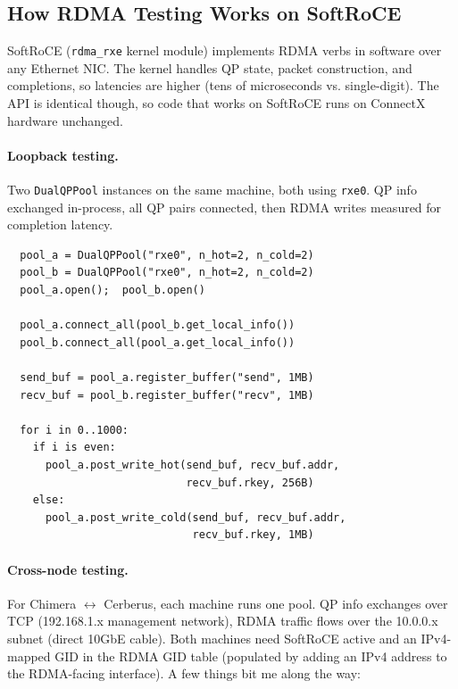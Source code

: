 \documentclass[11pt]{article}
\begin{document}
\subsection{How RDMA Testing Works on SoftRoCE}

SoftRoCE (\texttt{rdma\_rxe} kernel module) implements RDMA verbs in software over any Ethernet NIC. The kernel handles QP state, packet construction, and completions, so latencies are higher (tens of microseconds vs. single-digit). The API is identical though, so code that works on SoftRoCE runs on ConnectX hardware unchanged.

\paragraph{Loopback testing.} Two \texttt{DualQPPool} instances on the same machine, both using \texttt{rxe0}. QP info exchanged in-process, all QP pairs connected, then RDMA writes measured for completion latency.

\begin{verbatim}
  pool_a = DualQPPool("rxe0", n_hot=2, n_cold=2)
  pool_b = DualQPPool("rxe0", n_hot=2, n_cold=2)
  pool_a.open();  pool_b.open()

  pool_a.connect_all(pool_b.get_local_info())
  pool_b.connect_all(pool_a.get_local_info())

  send_buf = pool_a.register_buffer("send", 1MB)
  recv_buf = pool_b.register_buffer("recv", 1MB)

  for i in 0..1000:
    if i is even:
      pool_a.post_write_hot(send_buf, recv_buf.addr,
                            recv_buf.rkey, 256B)
    else:
      pool_a.post_write_cold(send_buf, recv_buf.addr,
                             recv_buf.rkey, 1MB)
\end{verbatim}

\paragraph{Cross-node testing.} For Chimera $\leftrightarrow$ Cerberus, each machine runs one pool. QP info exchanges over TCP (192.168.1.x management network), RDMA traffic flows over the 10.0.0.x subnet (direct 10GbE cable). Both machines need SoftRoCE active and an IPv4-mapped GID in the RDMA GID table (populated by adding an IPv4 address to the RDMA-facing interface). A few things bit me along the way:
\end{document}
